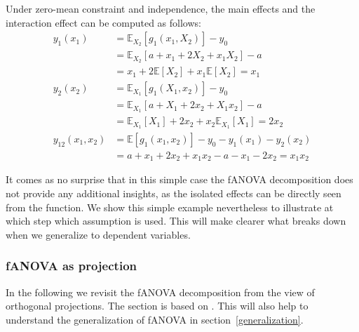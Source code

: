 Under zero-mean constraint and independence, the main effects and the interaction effect can be computed as follows:
\begin{align*}
y_1(x_1) &= \mathbb{E}_{X_2}[g_{1}(x_1, X_2)] - y_0 \\
&= \mathbb{E}_{X_2}[a + x_1 + 2X_2 + x_1X_2] - a \\
&= x_1 + 2\mathbb{E}[X_2] + x_1\mathbb{E}[X_2] = x_1\\
y_2(x_2) &= \mathbb{E}_{X_1}[g_{1}(X_1, x_2)] - y_0 \\
&= \mathbb{E}_{X_1}[a + X_1 + 2x_2 + X_1x_2] - a \\
&= \mathbb{E}_{X_1}[X_1] + 2x_2 + x_2\mathbb{E}_{X_1}[X_1] = 2x_2\\
y_{12}(x_1, x_2) &= \mathbb{E}[g_{1}(x_1, x_2)] - y_0 - y_1(x_1) - y_2(x_2) \\
&= a + x_1 + 2x_2 + x_1x_2 - a - x_1 - 2x_2 = x_1x_2
\end{align*}

It comes as no surprise that in this simple case the fANOVA decomposition does not provide any additional insights, as the isolated effects can be directly seen from the function.
We show this simple example nevertheless to illustrate at which step which assumption is used.
This will make clearer what breaks down when we generalize to dependent variables.


\subsubsection*{fANOVA as projection}
In the following we revisit the fANOVA decomposition from the view of orthogonal projections. The section is based on \cite{Vaart_1998}.
This will also help to understand the generalization of fANOVA in section~\ref{generalization}.\par

